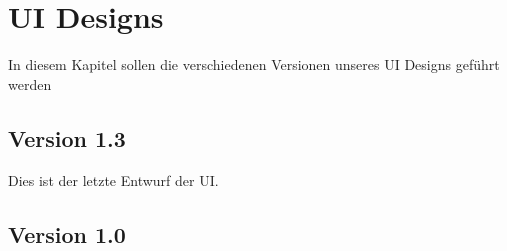 \section{UI Designs}
In diesem Kapitel sollen die verschiedenen Versionen unseres UI Designs geführt werden

\subsection{Version 1.3}
Dies ist der letzte Entwurf der UI.
\subsection{Version 1.0}